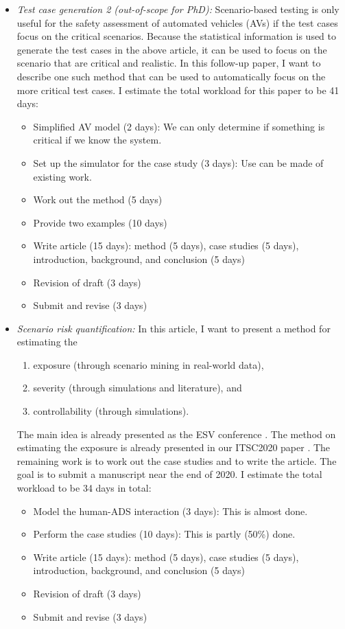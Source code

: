 \documentclass[10pt,final,a4paper,oneside,onecolumn]{article}
\begin{document}
\begin{itemize}
	\item \textit{Test case generation 2 (out-of-scope for PhD):} Scenario-based testing is only useful for the safety assessment of automated vehicles (AVs) if the test cases focus on the critical scenarios. Because the statistical information is used to generate the test cases in the above article, it can be used to focus on the scenario that are critical and realistic. In this follow-up paper, I want to describe one such method that can be used to automatically focus on the more critical test cases. I estimate the total workload for this paper to be 41 days:
	\begin{itemize}
		\item Simplified AV model (2 days): We can only determine if something is critical if we know the system.
		\item Set up the simulator for the case study (3 days): Use can be made of existing work.
		\item Work out the method (5 days)
		\item Provide two examples (10 days)
		\item Write article (15 days): method (5 days), case studies (5 days), introduction, background, and conclusion (5 days)
		\item Revision of draft (3 days)
		\item Submit and revise (3 days)
	\end{itemize}
	
	\item \textit{Scenario risk quantification:} In this article, I want to present a method for estimating the 
	\begin{enumerate}
		\item exposure (through scenario mining in real-world data),
		\item severity (through simulations and literature), and
		\item controllability (through simulations).
	\end{enumerate}
	The main idea is already presented as the ESV conference \cite{degelder2019risk}. The method on estimating the exposure is already presented in our ITSC2020 paper \cite{degelder2020scenariomining}. The remaining work is to work out the case studies and to write the article. The goal is to submit a manuscript near the end of 2020. I estimate the total workload to be 34 days in total:
	\begin{itemize}
		\item Model the human-ADS interaction (3 days): This is almost done. 
		\item Perform the case studies (10 days): This is partly (50\%) done.
		\item Write  article (15 days): method (5 days), case studies (5 days), introduction, background, and conclusion (5 days)
		\item Revision of draft (3 days)
		\item Submit and revise (3 days)
	\end{itemize}
	

\end{itemize}
\end{document}
